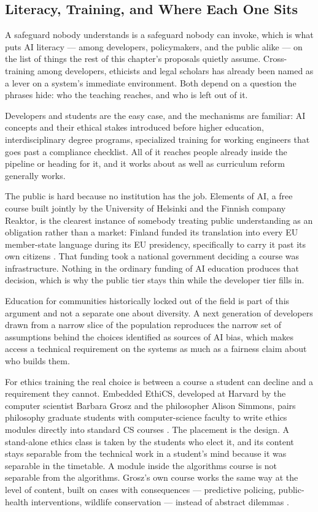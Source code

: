 \subsection{Literacy, Training, and Where Each One Sits}
\label{sec:8.3.6}
A safeguard nobody understands is a safeguard nobody can invoke, which is what puts AI literacy — among developers, policymakers, and the public alike — on the list of things the rest of this chapter's proposals quietly assume. Cross-training among developers, ethicists and legal scholars has already been named as a lever on a system's immediate environment. Both depend on a question the phrases hide: who the teaching reaches, and who is left out of it.

Developers and students are the easy case, and the mechanisms are familiar: AI concepts and their ethical stakes introduced before higher education, interdisciplinary degree programs, specialized training for working engineers that goes past a compliance checklist. All of it reaches people already inside the pipeline or heading for it, and it works about as well as curriculum reform generally works.

The public is hard because no institution has the job. Elements of AI, a free course built jointly by the University of Helsinki and the Finnish company Reaktor, is the clearest instance of somebody treating public understanding as an obligation rather than a market: Finland funded its translation into every EU member-state language during its EU presidency, specifically to carry it past its own citizens \autocite{helsinki2020elements}. That funding took a national government deciding a course was infrastructure. Nothing in the ordinary funding of AI education produces that decision, which is why the public tier stays thin while the developer tier fills in.

Education for communities historically locked out of the field is part of this argument and not a separate one about diversity. A next generation of developers drawn from a narrow slice of the population reproduces the narrow set of assumptions behind the choices identified as sources of AI bias, which makes access a technical requirement on the systems as much as a fairness claim about who builds them.

For ethics training the real choice is between a course a student can decline and a requirement they cannot. Embedded EthiCS, developed at Harvard by the computer scientist Barbara Grosz and the philosopher Alison Simmons, pairs philosophy graduate students with computer-science faculty to write ethics modules directly into standard CS courses \autocite{grosz2019embedded}. The placement is the design. A stand-alone ethics class is taken by the students who elect it, and its content stays separable from the technical work in a student's mind because it was separable in the timetable. A module inside the algorithms course is not separable from the algorithms. Grosz's own course works the same way at the level of content, built on cases with consequences — predictive policing, public-health interventions, wildlife conservation — instead of abstract dilemmas \autocite{harvardgazette2019ethics,harvardcs108schedule}.

